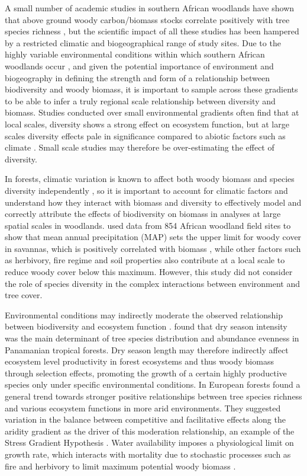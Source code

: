 \documentclass[11pt,a4paper]{article}
\begin{document}
A small number of academic studies in southern African woodlands have shown that above ground woody carbon/biomass stocks correlate positively with tree species richness \citep{McNicol2018, Shirima2015, Mutowo2012}, but the scientific impact of all these studies has been hampered by a restricted climatic and biogeographical range of study sites. Due to the highly variable environmental conditions within which southern African woodlands occur \citep{Frost1996}, and given the potential importance of environment and biogeography in defining the strength and form of a relationship between biodiversity and woody biomass, it is important to sample across these gradients to be able to infer a truly regional scale relationship between diversity and biomass. Studies conducted over small environmental gradients often find that at local scales, diversity shows a strong effect on ecosystem function, but at large scales diversity effects pale in significance compared to abiotic factors such as climate \citep{Pasari2013}. Small scale studies may therefore be over-estimating the effect of diversity.

In forests, climatic variation is known to affect both woody biomass \citep{Michaletz2014, Michaletz2018} and species diversity independently \citep{Spasojevic2014}, so it is important to account for climatic factors and understand how they interact with biomass and diversity to effectively model and correctly attribute the effects of biodiversity on biomass in analyses at large spatial scales in woodlands. \citet{Sankaran2005} used data from 854 African woodland field sites to show that mean annual precipitation (MAP) sets the upper limit for woody cover in savannas, which is positively correlated with biomass \citep{Chisholm2013, Prado-Junior2016}, while other factors such as herbivory, fire regime and soil properties also contribute at a local scale to reduce woody cover below this maximum. However, this study did not consider the role of species diversity in the complex interactions between environment and tree cover. 

Environmental conditions may indirectly moderate the observed relationship between biodiversity and ecosystem function \citep{Vila2005}. \citet{Condit2013} found that dry season intensity was the main determinant of tree species distribution and abundance evenness in Panamanian tropical forests. Dry season length may therefore indirectly affect ecosystem level productivity in forest ecosystems and thus woody biomass through selection effects, promoting the growth of a certain highly productive species only under specific environmental conditions. In European forests \citep{Ratcliffe2017} found a general trend towards stronger positive relationships between tree species richness and various ecosystem functions in more arid environments. They suggested variation in the balance between competitive and facilitative effects along the aridity gradient as the driver of this moderation relationship, an example of the Stress Gradient Hypothesis \citep{Dohn2013}. Water availability imposes a physiological limit on growth rate, which interacts with mortality due to stochastic processes such as fire and herbivory to limit maximum potential woody biomass \citep{Sankaran2005}. 
\end{document}
